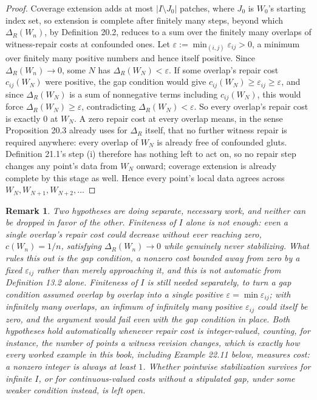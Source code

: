 \documentclass[11pt]{book}
\newtheorem{remark}[theorem]{Remark}
\begin{document}
\begin{proof}
Coverage extension adds at most $|I \setminus J_0|$ patches, where $J_0$ is $W_0$'s starting index set, so extension is complete after finitely many steps, beyond which $\Delta_R(W_n)$, by Definition 20.2, reduces to a sum over the finitely many overlaps of witness-repair costs at confounded ones. Let $\varepsilon := \min_{(i,j)} \varepsilon_{ij} > 0$, a minimum over finitely many positive numbers and hence itself positive. Since $\Delta_R(W_n) \to 0$, some $N$ has $\Delta_R(W_N) < \varepsilon$. If some overlap's repair cost $c_{ij}(W_N)$ were positive, the gap condition would give $c_{ij}(W_N) \geq \varepsilon_{ij} \geq \varepsilon$, and since $\Delta_R(W_N)$ is a sum of nonnegative terms including $c_{ij}(W_N)$, this would force $\Delta_R(W_N) \geq \varepsilon$, contradicting $\Delta_R(W_N) < \varepsilon$. So every overlap's repair cost is exactly $0$ at $W_N$. A zero repair cost at every overlap means, in the sense Proposition 20.3 already uses for $\Delta_R$ itself, that no further witness repair is required anywhere: every overlap of $W_N$ is already free of confounded gluts. Definition 21.1's step (i) therefore has nothing left to act on, so no repair step changes any point's data from $W_N$ onward; coverage extension is already complete by this stage as well. Hence every point's local data agrees across $W_N, W_{N+1}, W_{N+2}, \dots$
\end{proof}

\begin{remark}
Two hypotheses are doing separate, necessary work, and neither can be dropped in favor of the other. Finiteness of $I$ alone is not enough: even a single overlap's repair cost could decrease without ever reaching zero, $c(W_n) = 1/n$, satisfying $\Delta_R(W_n) \to 0$ while genuinely never stabilizing. What rules this out is the gap condition, a nonzero cost bounded away from zero by a fixed $\varepsilon_{ij}$ rather than merely approaching it, and this is not automatic from Definition 13.2 alone. Finiteness of $I$ is still needed separately, to turn a gap condition assumed overlap by overlap into a single positive $\varepsilon = \min \varepsilon_{ij}$; with infinitely many overlaps, an infimum of infinitely many positive $\varepsilon_{ij}$ could itself be zero, and the argument would fail even with the gap condition in place. Both hypotheses hold automatically whenever repair cost is integer-valued, counting, for instance, the number of points a witness revision changes, which is exactly how every worked example in this book, including Example 22.11 below, measures cost: a nonzero integer is always at least $1$. Whether pointwise stabilization survives for infinite $I$, or for continuous-valued costs without a stipulated gap, under some weaker condition instead, is left open.
\end{remark}
\end{document}
